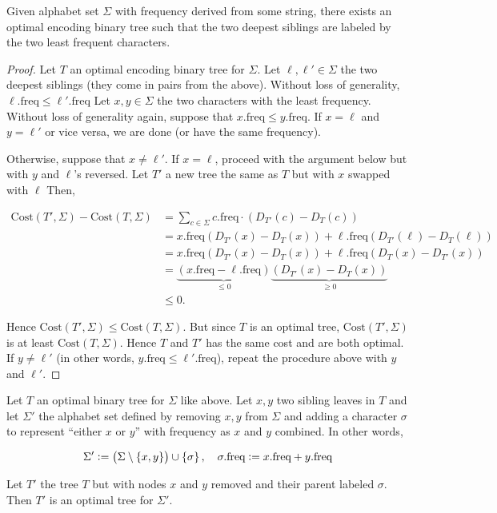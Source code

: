 \begin{lemma}
    Given alphabet set $\Sigma$ with frequency derived from some string, there exists an optimal encoding binary tree such that the two deepest siblings are labeled by the two least frequent characters.
\end{lemma}

\begin{proof}
    Let $T$ an optimal encoding binary tree for $\Sigma$.
    Let $\ell, \ell' \in \Sigma$ the two deepest siblings (they come in pairs from the above).
    Without loss of generality, $\ell.\text{freq} \le \ell'.\text{freq}$
    Let $x, y \in \Sigma$ the two characters with the least frequency. 
    Without loss of generality again, suppose that $x.\text{freq} \le y.\text{freq}$.
    If $x=\ell$ and $y=\ell'$ or vice versa, we are done (or have the same frequency).

    Otherwise, suppose that $x\neq\ell'$. If $x = \ell$, proceed with the argument below but with $y$ and $\ell$'s reversed.
    Let $T'$ a new tree the same as $T$ but with $x$ swapped with $\ell$ 
    Then, 

    \[
    \begin{split}
    \text{Cost}(T',\Sigma)-\text{Cost}(T,\Sigma) &= \sum_{c \in \Sigma} c.\text{freq}\cdot(D_{T'}(c) - D_T(c)) \\
    &= x.\text{freq}(D_{T'}(x)-D_{T}(x)) + \ell.\text{freq}(D_{T'}(\ell) - D_{T}(\ell)) \\
    &= x.\text{freq}(D_{T'}(x)-D_{T}(x)) + \ell.\text{freq}(D_{T}(x)- D_{T'}(x)) \\
    &= \underbrace{(x.\text{freq} - \ell.\text{freq})}_{\le 0} \underbrace{(D_{T'}(x)-D_{T}(x))}_{\ge 0} \\
    &\le 0.
    \end{split}
    \]

    Hence $\text{Cost}(T',\Sigma) \le \text{Cost}(T,\Sigma)$.
    But since $T$ is an optimal tree, $\text{Cost}(T',\Sigma)$ is at least $\text{Cost}(T,\Sigma)$. 
    Hence $T$ and $T'$ has the same cost and are both optimal.
    If $y \neq \ell'$ (in other words, $y.\text{freq} \le \ell'.\text{freq}$), repeat the procedure above with $y$ and $\ell'$. 
\end{proof}

\begin{lemma}
    Let $T$ an optimal binary tree for $\Sigma$ like above. 
    Let $x, y$ two sibling leaves in $T$ and let $\Sigma'$ the alphabet set defined by removing $x, y$ from $\Sigma$ and adding a character $\sigma$ to represent ``either $x$ or $y$'' with frequency as $x$ and $y$ combined.
    In other words, 

    \[
        \Sigma' \defeq \del{\Sigma \setminus \cbr{x, y}} \cup \cbr{\sigma}, \quad \sigma.\text{freq} 
        \defeq x.\text{freq} + y.\text{freq}
    \]

    Let $T'$ the tree $T$ but with nodes $x$ and $y$ removed and their parent labeled $\sigma$. Then 
    $T'$ is an optimal tree for $\Sigma'$. 
\end{lemma}

